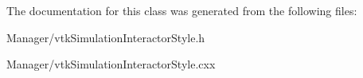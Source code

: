 The documentation for this class was generated from the following files:\begin{DoxyCompactItemize}
\item 
Manager/vtkSimulationInteractorStyle.h\item 
Manager/vtkSimulationInteractorStyle.cxx\end{DoxyCompactItemize}
